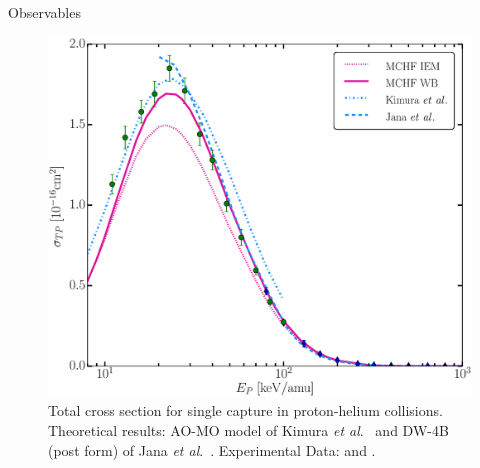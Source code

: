 \documentclass[letterpaper, 12 pt]{report}
\begin{document}
\begin{chapter}{Observables \label{chap:p-he2p-he}}
\begin{figure}[htp]
   \centering
   \includegraphics[width = \linewidth]{./images/phe/phe-TP.eps}
   \caption[Total cross section for single capture in proton-helium collisions.]
           {Total cross section for single capture in proton-helium collisions.
            Theoretical results: AO-MO model of Kimura \textit{et al}.\ \cite{KL-86} and DW-4B (post
            form) of Jana \textit{et al}.\ \cite{JMP-15}. Experimental Data:
            {\color{OliveGreen}{$\bullet$}} \cite{SG89} and {\color{blue}{$\blacklozenge$}}
            \cite{SG85}. \label{fig:phe-tp}}
\end{figure}


\end{chapter}
\end{document}
